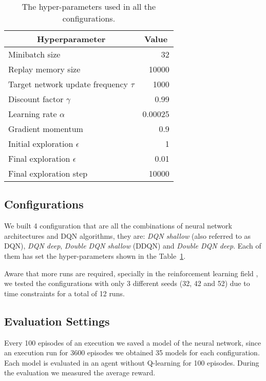 \begin{table}
	\centering
	\begin{tabular}{|l|r|}
		\hline
		\multicolumn{1}{|c|}{\textbf{Hyperparameter}} &
		\multicolumn{1}{|c|}{\textbf{Value}}        \\
		\hline
		Minibatch size & 32 \\
		Replay memory size & 10000 \\
		Target network update frequency $\tau$ & 1000 \\
		Discount factor $\gamma$ & 0.99 \\
		Learning rate $\alpha$ & 0.00025 \\
		Gradient momentum & 0.9 \\
		Initial exploration $\epsilon$ & 1 \\
		Final exploration $\epsilon$ & 0.01 \\
		Final exploration step & 10000 \\
		\hline
	\end{tabular}
	
	\caption{The hyper-parameters used in all the configurations.}
	\label{tab:my-hyperparams}
\end{table}

\subsection{Configurations}

We built 4 configuration that are all the combinations of neural network architectures and DQN algorithms, they are: \textit{DQN shallow} (also referred to as DQN), \textit{DQN deep}, \textit{Double DQN shallow} (DDQN) and \textit{Double DQN deep}. Each of them has set the hyper-parameters shown in the Table~\ref{tab:my-hyperparams}.

Aware that more runs are required, specially in the reinforcement learning field \cite{DBLP:journals/corr/abs-1709-06560}, we tested the configurations with only 3 different seeds (32, 42 and 52) due to time constraints for a total of 12 runs.


\subsection{Evaluation Settings}

Every 100 episodes of an execution we saved a model of the neural network, since an execution run for 3600 episodes we obtained 35 models for each configuration. Each model is evaluated in an agent without Q-learning for 100 episodes. During the evaluation we measured the average reward.

